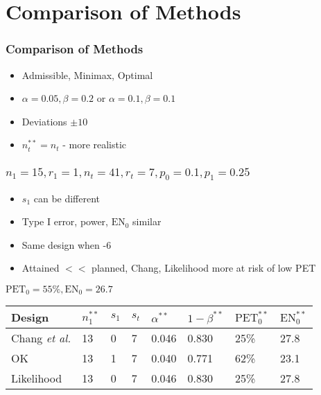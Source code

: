 \documentclass{beamer}\usepackage[]{graphicx}\usepackage[]{color}
\begin{document}
\section{Comparison of Methods}
\begin{frame} 
\frametitle{Comparison of Methods}
    \begin{itemize}
        \item Admissible, Minimax, Optimal
        \item $\alpha = 0.05, \beta = 0.2$ or $\alpha = 0.1, \beta = 0.1$
        \item Deviations $\pm 10$
        \item $n_t^{\ast\ast} = n_t$ - more realistic
    \end{itemize}
\end{frame}

\begin{frame}
\frametitle{$n_1=15, r_1=1, n_t=41, r_t=7, p_0 = 0.1, p_1 = 0.25$}
    \begin{itemize}
        \item $s_1$ can be different
        \item Type I error, power, $\mbox{EN}_0$ similar
        \item Same design when -6 %
        \item Attained $<<$ planned, Chang, Likelihood more at risk of low PET
    \end{itemize}
$\mbox{PET}_0 = 55\%, \mbox{EN}_0 = 26.7$
\begin{table}[]
\begin{tabular}{llllllll}
Design                  & $n_1^{\ast\ast}$ & $s_1$ & $s_t$ & $\alpha^{\ast\ast}$ & $1-\beta^{\ast\ast}$ & $\mbox{PET}^{\ast\ast}_0$ & $\mbox{EN}^{\ast\ast}_0$ \\ \hline
Chang \textit{et al.} & 13               & 0     & 7     & 0.046                                 & 0.830                & 25\%                      & 27.8                     \\
OK        & 13               & 1     & 7     & 0.040                                 & 0.771                & 62\%                      & 23.1                     \\
Likelihood              & 13               & 0     & 7     & 0.046                                 & 0.830                & 25\%                      & 27.8                    
\end{tabular}
\end{table}
\end{frame}
\end{document}
